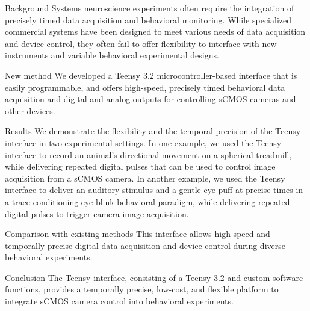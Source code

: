 Background
Systems neuroscience experiments often require the integration of precisely timed data acquisition and behavioral monitoring. While specialized commercial systems have been designed to meet various needs of data acquisition and device control, they often fail to offer flexibility to interface with new instruments and variable behavioral experimental designs.

New method
We developed a Teensy 3.2 microcontroller-based interface that is easily programmable, and offers high-speed, precisely timed behavioral data acquisition and digital and analog outputs for controlling sCMOS cameras and other devices.

Results
We demonstrate the flexibility and the temporal precision of the Teensy interface in two experimental settings. In one example, we used the Teensy interface to record an animal’s directional movement on a spherical treadmill, while delivering repeated digital pulses that can be used to control image acquisition from a sCMOS camera. In another example, we used the Teensy interface to deliver an auditory stimulus and a gentle eye puff at precise times in a trace conditioning eye blink behavioral paradigm, while delivering repeated digital pulses to trigger camera image acquisition.

Comparison with existing methods
This interface allows high-speed and temporally precise digital data acquisition and device control during diverse behavioral experiments.

Conclusion
The Teensy interface, consisting of a Teensy 3.2 and custom software functions, provides a temporally precise, low-cost, and flexible platform to integrate sCMOS camera control into behavioral experiments.


